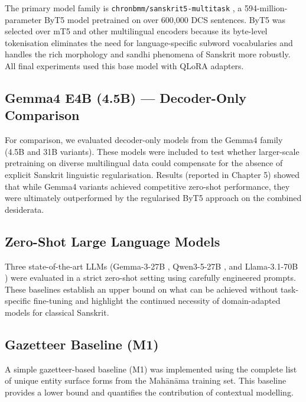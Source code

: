 The primary model family is \texttt{chronbmm/sanskrit5-multitask} \cite{nehrdich2024byt5sanskrit}, a 594-million-parameter ByT5 \cite{xue2022byt5} model pretrained on over 600,000 DCS \cite{hellwig2010dcs} sentences. ByT5 was selected over mT5 \cite{xue2021mt5} and other multilingual encoders because its byte-level tokenisation eliminates the need for language-specific subword vocabularies and handles the rich morphology and sandhi phenomena of Sanskrit more robustly. All final experiments used this base model with QLoRA \cite{dettmers2023qlora} adapters.

\subsection{Gemma4 E4B (4.5B) — Decoder-Only Comparison}
\label{subsec:gemma4}

For comparison, we evaluated decoder-only models from the Gemma4 family \cite{google2025gemma4} (4.5B and 31B variants). These models were included to test whether larger-scale pretraining on diverse multilingual data could compensate for the absence of explicit Sanskrit linguistic regularisation. Results (reported in Chapter 5) showed that while Gemma4 variants achieved competitive zero-shot performance, they were ultimately outperformed by the regularised ByT5 \cite{xue2022byt5} approach on the combined desiderata.

\subsection{Zero-Shot Large Language Models}
\label{subsec:llm_zeroshot}

Three state-of-the-art LLMs (Gemma-3-27B \cite{google2025gemma3}, Qwen3-5-27B \cite{qwen2025qwen35}, and Llama-3.1-70B \cite{meta2024llama31}) were evaluated in a strict zero-shot setting using carefully engineered prompts. These baselines establish an upper bound on what can be achieved without task-specific fine-tuning and highlight the continued necessity of domain-adapted models for classical Sanskrit.

\subsection{Gazetteer Baseline (M1)}
\label{subsec:gazetteer}

A simple gazetteer-based baseline (M1) was implemented using the complete list of unique entity surface forms from the Mahānāma \cite{sarkar2025mahanama} training set. This baseline provides a lower bound and quantifies the contribution of contextual modelling.

